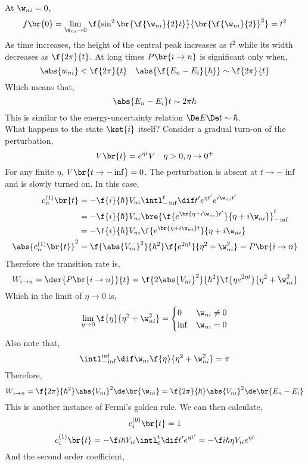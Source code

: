 \documentclass{article}
\begin{document}
At $\w_{ni}= 0$,
\[ f\br{0} = \lim_{\w_{ni} \to 0}\f{\sin^2\br{\f{\w_{ni}}{2}t}}{\br{\f{\w_{ni}}{2}}^2} = t^2 \]
As time increases, the height of the central peak increases as $t^2$ while its width decreases as $\f{2\pi}{t}$. At long times $P\br{i \to n}$ is significant only when,
\[ \abs{w_{ni}} < \f{2 \pi}{t} \quad \abs{\f{E_n - E_i}{\hbar}} \sim \f{2\pi}{t} \]
Which means that,
\[ \abs{E_n - E_i} t \sim 2 \pi \hbar \]
This is similar to the energy-uncertainty relation $\De E \De t \sim \hbar$. \\

What happens to the state $\ket{i}$ itself? Consider a gradual turn-on of the perturbation,
\[ V\br{t} = e^{\eta t} V \quad \eta > 0, \eta \to 0^{+}\]
For any finite $\eta$, $V\br{t \to -\inf} = 0$. The perturbation is absent at $t \to -\inf$ and is slowly turned on. In this case,
\begin{align*}
c^{(1)}_n\br{t}
&= - \f{i}{\hbar} V_{ni}\intl_{-\inf}^{t} \dif t' e^{\eta t'} e^{i \w_{ni} t'} \\
&= - \f{i}{\hbar} V_{ni} \bre{\f{e^{\br{\eta + i \w_{ni}} t'}}{\eta + i \w_{ni}}}_{-\inf}^{t} \\
&= - \f{i}{\hbar} V_{ni} {\f{e^{\br{\eta + i \w_{ni}} t}}{\eta + i \w_{ni}}} \\
\abs{c^{(1)}_n\br{t}}^2 &= \f{\abs{V_{ni}}^2}{\hbar^2} \f{e^{2\eta t}}{\eta^2 +\w_{ni}^2} = P\br{i \to n}
\end{align*}
Therefore the transition rate is,
\[ W_{i \to n} = \der{P\br{i \to n}}{t} = \f{2 \abs{V_{ni}}^2}{\hbar^2} \f{\eta e^{2 \eta t}}{\eta^2 + \w_{ni}^2} \]
Which in the limit of $\eta \to 0$ is,
\[ \lim_{\eta \to 0} \f{\eta}{\eta^2 + \w_{ni}^2} = \begin{cases}
    0 & \w_{ni} \neq 0 \\
    \inf & \w_{ni} = 0
\end{cases} \]
Also note that,
\[ \intl_{-\inf}^{\inf} \dif \w_{ni} \f{\eta}{\eta^2 + \w_{ni}^2} = \pi \]
Therefore,
\[ W_{i \to n} = \f{2 \pi }{\hbar^2} \abs{V_{ni}}^2 \de\br{\w_{ni}} = \f{2 \pi}{\hbar}\abs{V_{ni}}^2 \de\br{E_n - E_i} \]
This is another instance of Fermi's golden rule.
We can then calculate,
\[ c_i^{(0)}\br{t} = 1 \]
\[ c_{i}^{(1)}\br{t} = - \f i \hbar V_{ii} \intl_{0}^{t} \dif t' e^{\eta t'} = - \f i {\hbar \eta} V_{ii} e^{\eta t} \]
And the second order coefficient,
\end{document}
